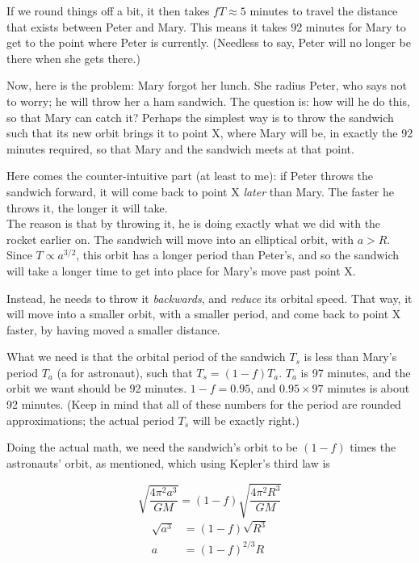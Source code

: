 \documentclass[8.01x]{subfiles}
\begin{document}
If we round things off a bit, it then takes $f T \approx 5$ minutes to travel the distance that exists between Peter and Mary. This means it takes 92 minutes for Mary to get to the point where Peter is currently. (Needless to say, Peter will no longer be there when she gets there.)

Now, here is the problem: Mary forgot her lunch. She radius Peter, who says not to worry; he will throw her a ham sandwich. The question is: how will he do this, so that Mary can catch it? Perhaps the simplest way is to throw the sandwich such that its new orbit brings it to point X, where Mary will be, in exactly the 92 minutes required, so that Mary and the sandwich meets at that point.

Here comes the counter-intuitive part (at least to me): if Peter throws the sandwich forward, it will come back to point X \emph{later} than Mary. The faster he throws it, the longer it will take.\\
The reason is that by throwing it, he is doing exactly what we did with the rocket earlier on. The sandwich will move into an elliptical orbit, with $a > R$. Since $T \propto a^{3/2}$, this orbit has a longer period than Peter's, and so the sandwich will take a longer time to get into place for Mary's move past point X.

Instead, he needs to throw it \emph{backwards}, and \emph{reduce} its orbital speed. That way, it will move into a smaller orbit, with a smaller period, and come back to point X faster, by having moved a smaller distance.

What we need is that the orbital period of the sandwich $T_s$ is less than Mary's period $T_a$ (a for astronaut), such that $T_s = (1 - f) T_a$. $T_a$ is 97 minutes, and the orbit we want should be 92 minutes. $1 - f = 0.95$, and $0.95 \times 97$ minutes is about 92 minutes. (Keep in mind that all of these numbers for the period are rounded approximations; the actual period $T_s$ will be exactly right.)

Doing the actual math, we need the sandwich's orbit to be $(1-f)$ times the astronauts' orbit, as mentioned, which using Kepler's third law is

\begin{equation}
\sqrt{\frac{4 \pi^2 a^3}{G M}} = (1-f) \sqrt{\frac{4 \pi^2 R^3}{G M}}
\end{equation}
\begin{align}
\sqrt{a^3} &= (1-f) \sqrt{R^3}\\
a &= (1-f)^{2/3} R
\end{align}
\end{document}
